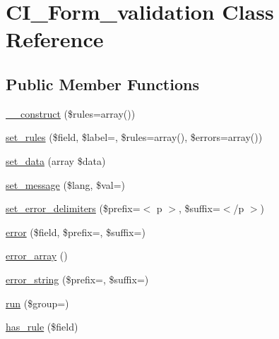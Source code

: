 \hypertarget{class_c_i___form__validation}{}\section{C\+I\+\_\+\+Form\+\_\+validation Class Reference}
\label{class_c_i___form__validation}
\subsection*{Public Member Functions}
\begin{DoxyCompactItemize}
\item 
\mbox{\hyperlink{class_c_i___form__validation_aaed5a8bb88ecb0810d3d345658c621a4}{\+\_\+\+\_\+construct}} (\$rules=array())
\item 
\mbox{\hyperlink{class_c_i___form__validation_a7f7c50fc575edf95314436a6e2a3257f}{set\+\_\+rules}} (\$field, \$label=\textquotesingle{}\textquotesingle{}, \$rules=array(), \$errors=array())
\item 
\mbox{\hyperlink{class_c_i___form__validation_a99b9f115475b8318ebb0cb018228492d}{set\+\_\+data}} (array \$data)
\item 
\mbox{\hyperlink{class_c_i___form__validation_af26170367050876cc1c0c9fd17269ae7}{set\+\_\+message}} (\$lang, \$val=\textquotesingle{}\textquotesingle{})
\item 
\mbox{\hyperlink{class_c_i___form__validation_a6a561ecf5cdad0444f0c64a146d4d44c}{set\+\_\+error\+\_\+delimiters}} (\$prefix=\textquotesingle{}$<$ p $>$\textquotesingle{}, \$suffix=\textquotesingle{}$<$/p $>$\textquotesingle{})
\item 
\mbox{\hyperlink{class_c_i___form__validation_a59e90b8676bd6b4f5edbb95f706b5185}{error}} (\$field, \$prefix=\textquotesingle{}\textquotesingle{}, \$suffix=\textquotesingle{}\textquotesingle{})
\item 
\mbox{\hyperlink{class_c_i___form__validation_a83c49bc246ea125660ad17d1d87da3e0}{error\+\_\+array}} ()
\item 
\mbox{\hyperlink{class_c_i___form__validation_a6862368ee2a08742bf381d10ea7f5439}{error\+\_\+string}} (\$prefix=\textquotesingle{}\textquotesingle{}, \$suffix=\textquotesingle{}\textquotesingle{})
\item 
\mbox{\hyperlink{class_c_i___form__validation_ab8ea7991f547f0ee4ba78cc4c0a3d4d1}{run}} (\$group=\textquotesingle{}\textquotesingle{})
\item 
\mbox{\hyperlink{class_c_i___form__validation_a1c8af1469a64e046b174a011bf30cc13}{has\+\_\+rule}} (\$field)

\end{DoxyCompactItemize}
